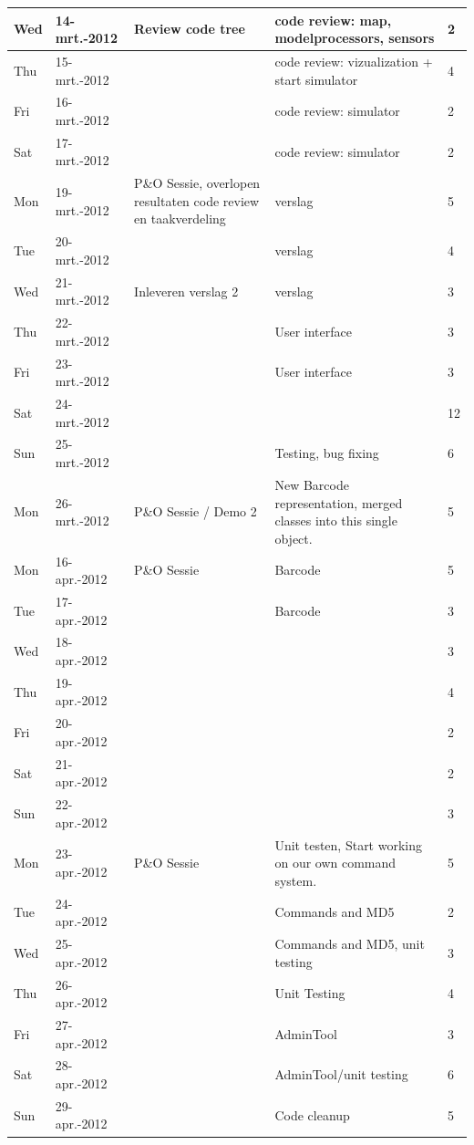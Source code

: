 \documentclass[12pt,a4paper]{report}
\begin{document}
\begin{landscape}
\begin{longtable}{llp{7cm}p{10cm}l}
\hline
Wed & 14-mrt.-2012 & Review code tree  & code review: map, modelprocessors, sensors & 2 \\ 
\hline
Thu & 15-mrt.-2012 &  & code review: vizualization + start simulator & 4 \\ 
\hline
Fri & 16-mrt.-2012 &  & code review: simulator & 2 \\ 
\hline
Sat & 17-mrt.-2012 &  & code review: simulator & 2 \\ 
\hline
Mon & 19-mrt.-2012 & P\&O Sessie, overlopen resultaten code review en taakverdeling & verslag & 5 \\ 
\hline
Tue & 20-mrt.-2012 &  & verslag & 4 \\ 
\hline
Wed & 21-mrt.-2012 & Inleveren verslag 2 & verslag & 3 \\ 
\hline
Thu & 22-mrt.-2012 &  & User interface & 3 \\ 
\hline
Fri & 23-mrt.-2012 &  & User interface & 3 \\ 
\hline
Sat & 24-mrt.-2012 &  &  & 12 \\ 
\hline
Sun & 25-mrt.-2012 &  & Testing, bug fixing & 6 \\ 
\hline
Mon & 26-mrt.-2012 & P\&O Sessie / Demo 2 & New Barcode representation, merged classes into this single object. & 5 \\ 
\hline
Mon & 16-apr.-2012 & P\&O Sessie & Barcode & 5 \\ 
\hline
Tue & 17-apr.-2012 &  & Barcode & 3 \\ 
\hline
Wed & 18-apr.-2012 &  &  & 3 \\ 
\hline
Thu & 19-apr.-2012 &  &  & 4 \\ 
\hline
Fri & 20-apr.-2012 &  &  & 2 \\ 
\hline
Sat & 21-apr.-2012 &  &  & 2 \\ 
\hline
Sun & 22-apr.-2012 &  &  & 3 \\ 
\hline
Mon & 23-apr.-2012 & P\&O Sessie & Unit testen, Start working on our own command system. & 5 \\ 
\hline
Tue & 24-apr.-2012 &  & Commands and MD5 & 2 \\ 
\hline
Wed & 25-apr.-2012 &  & Commands and MD5, unit testing & 3 \\ 
\hline
Thu & 26-apr.-2012 &  & Unit Testing & 4 \\ 
\hline
Fri & 27-apr.-2012 &  & AdminTool & 3 \\ 
\hline
Sat & 28-apr.-2012 &  & AdminTool/unit testing & 6 \\ 
\hline
Sun & 29-apr.-2012 &  & Code cleanup & 5 \\ 

\end{longtable}
\end{landscape}
\end{document}
